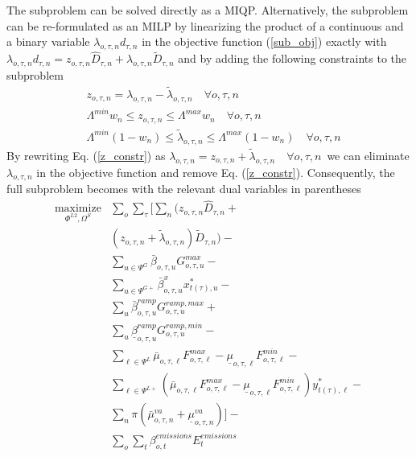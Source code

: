 \documentclass[final]{IEEEtran}
\begin{document}
The subproblem can be solved directly as a MIQP. Alternatively, the subproblem can be re-formulated as an MILP by linearizing the product of a continuous and a binary variable $\lambda_{o, \tau, n} d_{\tau, n}$ in the objective function (\ref{sub_obj}) exactly with $\lambda_{o, \tau, n} d_{\tau, n} = z_{o, \tau, n} \hat{D}_{\tau, n} + \lambda_{o, \tau, n} \tilde{D}_{\tau, n}$ and by adding the following constraints to the subproblem
\begin{align}
&\label{z_constr} z_{o, \tau, n} = \lambda_{o, \tau, n} - \tilde{\lambda}_{o, \tau, n} \quad \forall o, \tau, n \\
&\Lambda^{min} w_n \leq z_{o, \tau, n} \leq \Lambda^{max} w_n \quad \forall o, \tau, n \\
&\Lambda^{min} (1 - w_n) \leq \tilde{\lambda}_{o, \tau, n} \leq \Lambda^{max} (1 - w_n) \quad \forall o, \tau, n
\end{align}
By rewriting Eq. (\ref{z_constr}) as $\lambda_{o, \tau, n} = z_{o, \tau, n} + \tilde{\lambda}_{o, \tau, n} \quad \forall o, \tau, n$ we can eliminate $\lambda_{o, \tau, n}$ in the objective function and remove Eq. (\ref{z_constr}). Consequently, the full subproblem becomes with the relevant dual variables in parentheses
\begin{align}
\label{subproblem_obj}\underset{\Phi^{L2}, \Omega^{S}}{\text{maximize}} &\sum\limits_o \sum\limits_{\tau} \Bigg[ \sum\limits_n \Big( z_{o, \tau, n} \hat{D}_{\tau, n} + \nonumber \\
&(z_{o, \tau, n} + \tilde{\lambda}_{o, \tau, n}) \tilde{D}_{\tau, n} \Big) - \nonumber \\
&\sum\limits_{u \in \Psi^G} \bar{\beta}_{o, \tau, u} G_{o, \tau, u}^{max} - \nonumber \\
&\sum\limits_{u \in \Psi^{G+}} \bar{\beta}^x_{o, \tau, u} x_{t(\tau), u}^* - \nonumber \\
&\sum\limits_{u} \bar{\beta}_{o, \tau, u}^{ramp} G^{ramp,max}_{o, \tau, u} + \nonumber \\
&\sum\limits_{u} \underline{\beta}_{o, \tau, u}^{ramp} G^{ramp,min}_{o, \tau, u} - \nonumber \\
&\sum\limits_{\ell \in \Psi^L} \bar{\mu}_{o, \tau, \ell} F_{o, \tau, \ell}^{max} - \underline{\mu}_{o, \tau, \ell} F_{o, \tau, \ell}^{min} - \nonumber \\
&\sum\limits_{\ell \in \Psi^{L+}} \left( \bar{\mu}_{o, \tau, \ell} F_{o, \tau, \ell}^{max} - \underline{\mu}_{o, \tau, \ell} F_{o, \tau, \ell}^{min} \right) y_{t(\tau), \ell}^* - \nonumber \\
&\sum\limits_{n} \pi ( \bar{\mu}^{va}_{o, \tau, n} + \underline{\mu}^{va}_{o, \tau, n} ) \Bigg] - \nonumber \\
&\sum\limits_{o} \sum\limits_{t} \beta_{o, t}^{emissions} E^{emissions}_{t}
\end{align}
\end{document}
